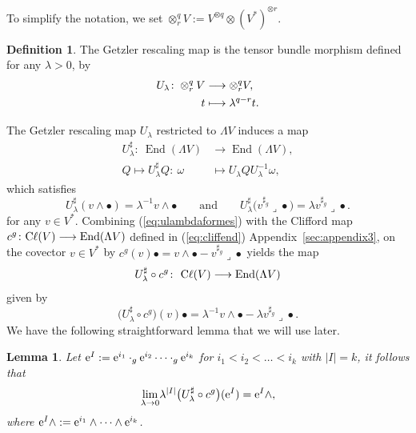 \documentclass[pdftex]{sigma}
\numberwithin{equation}{section}
\newtheorem{lem}[thm]{Lemma}
\theoremstyle{definition}
\newtheorem{defn}[thm]{Definition}
\newcommand{\Cl}{{\rm C}\ell}
\begin{document}
To simplify the notation, we set $ \otimes_r^q V:=V^{\otimes q}\otimes (V^*)^{\otimes r}$.
\begin{defn} \label{getzlerrescaling}
The Getzler rescaling map is the tensor bundle morphism defined for any $\lambda>0$, by
\begin{align}
U_\lambda\colon \otimes_r^q V &\longrightarrow \otimes_r^q V, \nonumber\\
\hphantom{U_\lambda\colon}{} \ t &\longmapsto 	 \lambda^{ q-r} t.\label{eq:getzlerrescaling}
\end{align}
\end{defn}
The Getzler rescaling map $U_\lambda$ restricted to $\Lambda V$ induces a map
\begin{align}
U_\lambda^\sharp\colon \ \operatorname{End}(\Lambda V) & \longrightarrow \operatorname{End}(\Lambda V), \nonumber\\
Q \longmapsto U_\lambda^\sharp Q\colon \ \omega & \mapsto U_\lambda Q U_\lambda^{-1}\omega,\label{eq:actionulambda}
\end{align}
which satisfies
\begin{equation}\label{eq:ulambdaformes}
U_\lambda^\sharp(v\wedge\bullet)= \lambda^{-1}v\wedge\bullet \qquad\text{and}\qquad U_\lambda^{\sharp}\bigl(v^{\sharp_g}\lrcorner\bullet\bigr)= \lambda v^{\sharp_g}\lrcorner\bullet.
\end{equation}
for any $v\in V^*$. Combining (\ref{eq:ulambdaformes}) with the Clifford map $ c^g\colon \Cl(V) \longrightarrow \operatorname{End}(\Lambda V)$ defined in (\ref{eq:cliffend}) Appendix~\ref{sec:appendix3}, on the covector $v\in V^*$ by $ c^g(v)\bullet =v\wedge\bullet -v^{\sharp_g} \lrcorner\bullet$
 yields the map
 \begin{equation*}
 U_\lambda^\sharp\circ c^g\colon \ \Cl(V) \longrightarrow \operatorname{End}(\Lambda V)
 \end{equation*}
 given by
	\[ \bigl(U_\lambda^\sharp\circ c^g\bigr)(v)\bullet=\lambda^{-1} v\wedge\bullet-\lambda v^{\sharp_g}\lrcorner\bullet.\]
We have the following straightforward lemma that we will use later.

\begin{lem} Let ${\rm e}^I:={\rm e}^{i_1}\cdot_g {\rm e}^{i_2}\dots \cdot_g {\rm e}^{i_k}$ for $i_1<i_2<\dots<i_k$ with {$|I|= k$}, it follows that
\begin{equation}\label{eq:limUlambdac}
\underset{\lambda\to 0}{\lim} \lambda^{|I|}\bigl(U_\lambda^\sharp\circ c^g\bigr)({\rm e}^I)= {\rm e}^I\wedge,
\end{equation}
 where ${\rm e}^I\wedge:={\rm e}^{i_1}\wedge\dots \wedge {\rm e}^{i_k}$.
 \end{lem}
\end{document}
